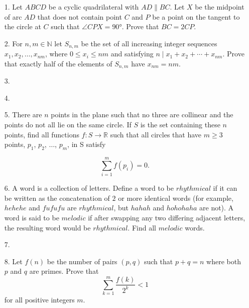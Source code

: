 \documentclass{article}
\begin{document}
\begin{enumerate}

\bigskip
\item[1.] %
Let $ABCD$ be a cyclic quadrilateral with $AD \parallel BC$. Let $X$ be the midpoint of arc $AD$ that does not contain point $C$ and $P$ be a point on the tangent to the circle at $C$ such that $\angle CPX = 90 \si{\degree} $. Prove that $BC = 2 CP$.   


\medskip
\item[2.] %
For $n,m\in\mathbb{N}$ let $S_{n,m}$ be the set of all increasing integer sequences $x_{1},x_{2},\ldots,x_{nm}$, where $0\leq x_i\leq nm$ and satisfying $n \mid x_{1} + x_{2} + \cdots +x_{nm}$. Prove that exactly half of the elements of $S_{n,m}$ have $x_{nm}=nm$.


\medskip
\item[3.] %


\medskip
\item[4.] %


\medskip
\item[5.] %
There are $n$ points in the plane such that no three are collinear and the points do not all lie on the same circle. If $S$ is the set containing these $n$ points, find all functions $f : S \rightarrow \mathbb{R}$ such that all circles that have $m \ge 3$ points, $p_1$, $p_2$, $\dots$, $p_m$, in S satisfy

$$\sum_{i = 1}^{m} f(p_i) = 0.$$



\medskip
\item[6.] %
A word is a collection of letters. Define a word to be $rhythmical$ if it can be written as the concatenation of $2$ or more identical words (for example, $hehehe$ and $fufufu$ are $rhythmical$, but $hahah$ and $hohohaha$ are not). A word is said to be $melodic$ if after swapping any two differing adjacent letters, the resulting word would be $rhythmical$. Find all $melodic$ words.


\medskip
\item[7.] %


\medskip
\item[8.] %
Let $f(n)$ be the number of pairs $(p, q)$ such that $p + q = n$ where both $p$ and $q$ are primes. Prove that
$$\sum_{k = 1}^{m} \frac{f(k)}{2^k} < 1$$
for all positive integers $m$.


\end{enumerate}
\end{document}
